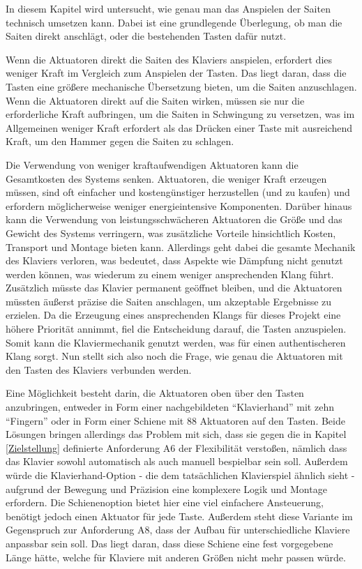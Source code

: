 In diesem Kapitel wird untersucht, wie genau man das Anspielen der Saiten technisch umsetzen kann.
Dabei ist eine grundlegende Überlegung, ob man die Saiten direkt anschlägt,
oder die bestehenden Tasten dafür nutzt.

Wenn die Aktuatoren direkt die Saiten des Klaviers anspielen, erfordert dies weniger Kraft im Vergleich zum
Anspielen der Tasten. Das liegt daran, dass die Tasten eine größere mechanische Übersetzung bieten, um die Saiten
anzuschlagen. Wenn die Aktuatoren direkt auf die Saiten wirken, müssen sie nur die erforderliche Kraft aufbringen, um
die Saiten in Schwingung zu versetzen, was im Allgemeinen weniger Kraft erfordert als das Drücken einer Taste mit
ausreichend Kraft, um den Hammer gegen die Saiten zu schlagen.

Die Verwendung von weniger kraftaufwendigen Aktuatoren kann die Gesamtkosten des Systems senken. Aktuatoren, die weniger
Kraft erzeugen müssen, sind oft einfacher und kostengünstiger herzustellen (und zu kaufen) und erfordern möglicherweise weniger
energieintensive Komponenten. Darüber hinaus kann die Verwendung von leistungsschwächeren
Aktuatoren die Größe und das Gewicht des Systems verringern, was zusätzliche Vorteile hinsichtlich Kosten, Transport und
Montage bieten kann. \newline
Allerdings geht dabei die gesamte Mechanik des Klaviers verloren, was bedeutet, dass Aspekte wie Dämpfung nicht genutzt werden können,
was wiederum zu einem weniger ansprechenden Klang führt. Zusätzlich müsste das Klavier permanent geöffnet bleiben, und die
Aktuatoren müssten äußerst präzise die Saiten anschlagen, um akzeptable Ergebnisse zu erzielen.
Da die Erzeugung eines ansprechenden Klangs für dieses Projekt eine höhere Priorität annimmt, fiel die Entscheidung
darauf, die Tasten anzuspielen. Somit kann die Klaviermechanik genutzt werden, was für einen
authentischeren Klang sorgt. \newline
Nun stellt sich also noch die Frage, wie genau die Aktuatoren mit den Tasten des Klaviers verbunden werden.

Eine Möglichkeit besteht darin, die Aktuatoren oben über den Tasten anzubringen, entweder in Form einer nachgebildeten
\enquote{Klavierhand} mit zehn \enquote{Fingern} oder in Form einer Schiene mit 88 Aktuatoren auf den Tasten.
Beide Lösungen bringen allerdings das Problem mit sich, dass sie gegen die in Kapitel \ref{Zielstellung} definierte Anforderung A6
der Flexibilität verstoßen, nämlich dass das Klavier sowohl automatisch als auch manuell bespielbar sein soll.\newline
Außerdem würde die Klavierhand-Option - die dem tatsächlichen Klavierspiel ähnlich sieht -
aufgrund der Bewegung und Präzision eine komplexere Logik und
Montage erfordern. Die Schienenoption bietet hier eine viel einfachere Ansteuerung, benötigt jedoch einen Aktuator für jede Taste.
Außerdem steht diese Variante im Gegenspruch zur Anforderung A8, dass der Aufbau für unterschiedliche Klaviere anpassbar
sein soll. Das liegt daran, dass diese Schiene eine fest vorgegebene Länge hätte, welche für Klaviere mit anderen Größen nicht mehr passen würde. \newline

